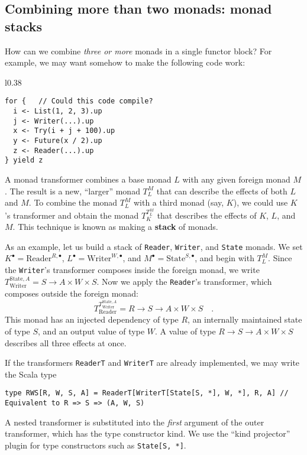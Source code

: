 \subsection{Combining more than two monads: monad stacks\label{subsec:Combining-more-than-monad-stacks}}

How can we combine \emph{three or more} monads in a single functor
block? For example, we may want somehow to make the following code
work:

\begin{wrapfigure}{l}{0.38\columnwidth}%
\vspace{-0.5\baselineskip}
\begin{lstlisting}
for {   // Could this code compile?
  i <- List(1, 2, 3).up
  j <- Writer(...).up
  x <- Try(i + j + 100).up
  y <- Future(x / 2).up
  z <- Reader(...).up
} yield z
\end{lstlisting}

\vspace{-1.2\baselineskip}
\end{wrapfigure}%

\noindent A monad transformer combines a base monad $L$ with any
given foreign monad $M$. The result is a new, \textsf{``}larger\textsf{''} monad
$T_{L}^{M}$ that can describe the effects of both $L$ and $M$.
To combine the monad $T_{L}^{M}$ with a third monad (say, $K$),
we could use $K$\textsf{'}s transformer and obtain the monad $T_{K}^{T_{L}^{M}}$
that describes the effects of $K$, $L$, and $M$. This technique
is known as making a \textbf{stack} of monads.

As an example, let us build a stack of \lstinline!Reader!, \lstinline!Writer!,
and \lstinline!State! monads. We set $K^{\bullet}=\text{Reader}^{R,\bullet}$,
$L^{\bullet}=\text{Writer}^{W,\bullet}$, and $M^{\bullet}=\text{State}^{S,\bullet}$,
and begin with $T_{L}^{M}$. Since the \lstinline!Writer!\textsf{'}s transformer
composes inside the foreign monad, we write $T_{\text{Writer}}^{\text{State},A}=S\rightarrow A\times W\times S$.
Now we apply the \lstinline!Reader!\textsf{'}s transformer, which composes
outside the foreign monad:
\[
T_{\text{Reader}}^{T_{\text{Writer}}^{\text{State},A}}=R\rightarrow S\rightarrow A\times W\times S\quad.
\]
This monad has an injected dependency of type $R$, an internally
maintained state of type $S$, and an output value of type $W$. A
value of type $R\rightarrow S\rightarrow A\times W\times S$ describes
all three effects at once.

If the transformers \lstinline!ReaderT! and \lstinline!WriterT!
are already implemented, we may write the Scala type
\begin{lstlisting}
type RWS[R, W, S, A] = ReaderT[WriterT[State[S, *], W, *], R, A] // Equivalent to R => S => (A, W, S)
\end{lstlisting}
A nested transformer is substituted into the \emph{first} argument
of the outer transformer, which has the type constructor kind. We
use the \textsf{``}kind projector\textsf{''}
plugin for type constructors such as \lstinline!State[S, *]!.

